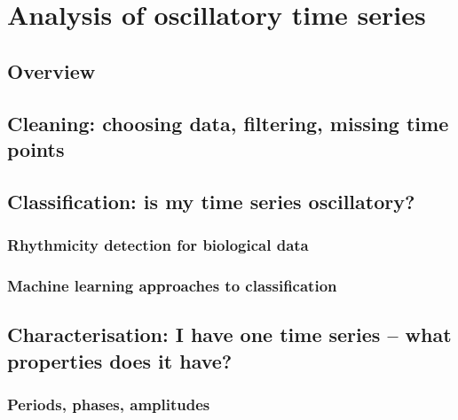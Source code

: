 \chapter{Analysis of oscillatory time series}
\label{ch:analysis}

\section{Overview}
\label{sec:analysis-overview}


\section{Cleaning: choosing data, filtering, missing time points}
\label{sec:analysis-cleaning}

\section{Classification: is my time series oscillatory?}
\label{sec:analysis-classification}

\subsection{Rhythmicity detection for biological data}
\label{subsec:analysis-classification-rhythmicity}

\subsection{Machine learning approaches to classification}
\label{subsec:analysis-classification-ml}

\section{Characterisation: I have one time series -- what properties does it have?}
\label{sec:analysis-characterisation}

\subsection{Periods, phases, amplitudes}
\label{subsec:analysis-characterisation-quantities}

